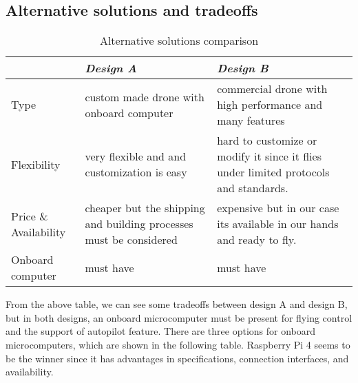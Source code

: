 \documentclass[../main.tex]{subfiles}
\begin{document}
\subsection{Alternative solutions and tradeoffs}
\begin{table}[hbt!]
	\begin{tabular}{ | p{4cm}| p{6cm} | p{6cm} |}
		\hline
		\textit{} & \textit{Design A} & \textit{Design B}\\ \hline
		Type  & custom made drone with onboard computer & commercial drone with high performance and many features    \\ \hline
		Flexibility & very flexible and and customization is easy & hard to customize or modify it since it flies under limited protocols and standards. \\ \hline
		
		Price \& Availability & cheaper but the shipping and building processes must be considered & expensive but in our case its available in our hands and ready to fly.   \\ \hline
		
		Onboard computer & must have & must have \\ \hline
		
		
		
	\end{tabular}
	\caption{Alternative solutions comparison}
\end{table} \label{tab: Alternative solutions and tradeoffs comparison }
From the above table, we can see some tradeoffs between design A and design B, but in both designs, an onboard microcomputer must be present for flying control and the support of autopilot feature. There are three options for onboard microcomputers, which are shown in the following table. Raspberry Pi 4 seems to be the winner since it has advantages in specifications, connection interfaces, and availability.
\end{document}
